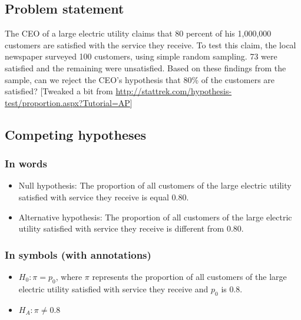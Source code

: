 \documentclass[12pt, krantz2,]{krantz}
\providecommand{\tightlist}{%
  \setlength{\itemsep}{0pt}\setlength{\parskip}{0pt}}
\begin{document}
\hypertarget{problem-statement-1}{%
\subsection{Problem statement}\label{problem-statement-1}}

The CEO of a large electric utility claims that 80 percent of his 1,000,000 customers are satisfied with the service they receive. To test this claim, the local newspaper surveyed 100 customers, using simple random sampling. 73 were satisfied and the remaining were unsatisfied. Based on these findings from the sample, can we reject the CEO's hypothesis that 80\% of the customers are satisfied? {[}Tweaked a bit from \url{http://stattrek.com/hypothesis-test/proportion.aspx?Tutorial=AP}{]}

\hypertarget{competing-hypotheses-1}{%
\subsection{Competing hypotheses}\label{competing-hypotheses-1}}

\hypertarget{in-words-1}{%
\subsubsection*{In words}\label{in-words-1}}


\begin{itemize}
\item
  Null hypothesis: The proportion of all customers of the large electric utility satisfied with service they receive is equal 0.80.
\item
  Alternative hypothesis: The proportion of all customers of the large electric utility satisfied with service they receive is different from 0.80.
\end{itemize}

\hypertarget{in-symbols-with-annotations-1}{%
\subsubsection*{In symbols (with annotations)}\label{in-symbols-with-annotations-1}}


\begin{itemize}
\tightlist
\item
  \(H_0: \pi = p_{0}\), where \(\pi\) represents the proportion of all customers of the large electric utility satisfied with service they receive and \(p_0\) is 0.8.
\item
  \(H_A: \pi \ne 0.8\)
\end{itemize}
\end{document}
